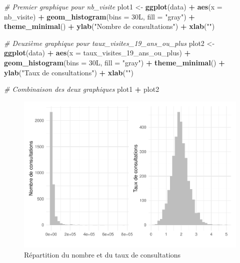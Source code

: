 \documentclass[
]{article}
\newenvironment{Shaded}{\begin{snugshade}}{\end{snugshade}}
\newcommand{\AttributeTok}[1]{\textcolor[rgb]{0.13,0.29,0.53}{#1}}
\newcommand{\CommentTok}[1]{\textcolor[rgb]{0.56,0.35,0.01}{\textit{#1}}}
\newcommand{\DataTypeTok}[1]{\textcolor[rgb]{0.13,0.29,0.53}{#1}}
\newcommand{\DecValTok}[1]{\textcolor[rgb]{0.00,0.00,0.81}{#1}}
\newcommand{\FunctionTok}[1]{\textcolor[rgb]{0.13,0.29,0.53}{\textbf{#1}}}
\newcommand{\NormalTok}[1]{#1}
\newcommand{\OtherTok}[1]{\textcolor[rgb]{0.56,0.35,0.01}{#1}}
\newcommand{\SpecialCharTok}[1]{\textcolor[rgb]{0.81,0.36,0.00}{\textbf{#1}}}
\newcommand{\StringTok}[1]{\textcolor[rgb]{0.31,0.60,0.02}{#1}}
\begin{document}
\begin{Shaded}
\begin{Highlighting}[]
\CommentTok{\# Premier graphique pour nb\_visite}
\NormalTok{plot1 }\OtherTok{\textless{}{-}} \FunctionTok{ggplot}\NormalTok{(data) }\SpecialCharTok{+}
  \FunctionTok{aes}\NormalTok{(}\AttributeTok{x =}\NormalTok{ nb\_visite) }\SpecialCharTok{+}
  \FunctionTok{geom\_histogram}\NormalTok{(}\AttributeTok{bins =} \DecValTok{30}\DataTypeTok{L}\NormalTok{, }\AttributeTok{fill =} \StringTok{"gray"}\NormalTok{) }\SpecialCharTok{+}
  \FunctionTok{theme\_minimal}\NormalTok{() }\SpecialCharTok{+}
  \FunctionTok{ylab}\NormalTok{(}\StringTok{"Nombre de consultations"}\NormalTok{) }\SpecialCharTok{+}
  \FunctionTok{xlab}\NormalTok{(}\StringTok{""}\NormalTok{)}

\CommentTok{\# Deuxième graphique pour taux\_visites\_19\_ans\_ou\_plus}
\NormalTok{plot2 }\OtherTok{\textless{}{-}} \FunctionTok{ggplot}\NormalTok{(data) }\SpecialCharTok{+}
  \FunctionTok{aes}\NormalTok{(}\AttributeTok{x =}\NormalTok{ taux\_visites\_19\_ans\_ou\_plus) }\SpecialCharTok{+}
  \FunctionTok{geom\_histogram}\NormalTok{(}\AttributeTok{bins =} \DecValTok{30}\DataTypeTok{L}\NormalTok{, }\AttributeTok{fill =} \StringTok{"gray"}\NormalTok{) }\SpecialCharTok{+}
  \FunctionTok{theme\_minimal}\NormalTok{() }\SpecialCharTok{+}
  \FunctionTok{ylab}\NormalTok{(}\StringTok{"Taux de consultations"}\NormalTok{) }\SpecialCharTok{+}
  \FunctionTok{xlab}\NormalTok{(}\StringTok{""}\NormalTok{)}

\CommentTok{\# Combinaison des deux graphiques}
\NormalTok{plot1 }\SpecialCharTok{+}\NormalTok{ plot2}
\end{Highlighting}
\end{Shaded}

\begin{figure}

{\centering \includegraphics{4_Analyse_Descriptive_files/figure-latex/unnamed-chunk-6-1} 

}

\caption{Répartition du nombre et du taux de consultations}\label{fig:unnamed-chunk-6}
\end{figure}
\end{document}
